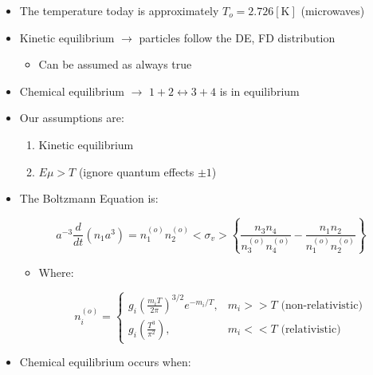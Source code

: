 \begin{itemize}
\begin{itemize}
\begin{itemize}
        \end{itemize}

      \item The temperature today is approximately $T_o=2.726[\si{\kelvin}]$ (microwaves)

      \item Kinetic equilibrium $\to$ particles follow the DE, FD distribution

        \begin{itemize}
            
          \item Can be assumed as always true

        \end{itemize}

      \item Chemical equilibrium $\to$ $1 + 2\leftrightarrow 3+4$ is in equilibrium

      \item Our assumptions are:

        \begin{enumerate}

          \item Kinetic equilibrium

          \item $E\mu > T$ (ignore quantum effects $\pm1$)

        \end{enumerate}

      \item The Boltzmann Equation is:

        $$a^{-3}\frac{d}{dt}(n_1a^3)=n_1^{(o)}n_2^{(o)}<\sigma_v>\left\{ \frac{n_3n_4}{n_3^{(o)}n_4^{(o)}}-\frac{n_1n_2}{n_1^{(o)}n_2^{(o)}} \right\}$$

        \begin{itemize}

          \item Where:

            $$n_i^{(o)}=\left\{\begin{array}{ll} g_i\left( \frac{m_iT}{2\pi} \right)^{3/2}e^{-m_i/T}, & m_i>>T\text{ (non-relativistic)}\\ g_i\left( \frac{T^3}{\pi^2} \right), & m_i<<T\text{ (relativistic)}\end{array}$$

        \end{itemize}

      \item Chemical equilibrium occurs when:


\end{itemize}
\end{itemize}
